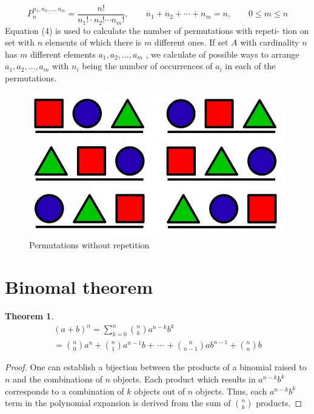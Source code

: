 \documentclass[11pt,a4paper]{article}
\newtheorem{thm}{Theorem}
\begin{document}
	\begin{equation}\label{pr}
	\overline P_n^{n_1,n_2,\ldots ,n_m}=\frac{n!}{n_1!\cdot n_2!\cdots n_m!},\qquad n_1+n_2+\cdots +n_m=n,\qquad 0\le m\le n
	\end{equation}
	Equation (4) is used to calculate the number of permutations with repeti-
	tion on set with $n$ elements of which there is $m$ different ones. If set $A$ with
	cardinality $n$ has $m$ different elements $a_1 , a_2 , \ldots , a_m$ , we calculate of possible
	ways to arrange $a_1 , a_2 , \ldots , a_m $ with $n_i$ being the number of occurrences of
	$a_i$ in each of the permutations.
	
	\begin{figure}[h]
		
		\includegraphics[scale=0.2]{permutations.png}
		\caption{Permutations without repetition}
		\label{fig : Perm}
		
		
	\end{figure}

\section{Binomal theorem}

\begin{thm}
	\begin{multline}
	(a + b)^n = \sum_{k=0}^{n}{n \choose k}a^{n-k}b^k  \\= {n \choose 0}a^n + {n \choose 1}a^{n-1}b + \, \cdots \, + {n \choose n-1}ab^{n-1} + {n \choose n}b
	\end{multline}
\end{thm}
\begin{proof}
	One can establish a bijection between the products of a binomial
	raised to $n$ and the combinations of $n$ objects. Each product which results
	in $a^{n-k}b^k$ corresponds to a combination of $k$ objects out of $n$ objects. Thus, each  $a^{n-k} b^k$ term in the polynomial expansion is derived from the sum of ${n \choose k}$ products.
\end{proof}
\end{document}
